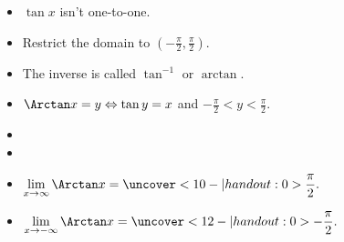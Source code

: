 \begin{frame}
\begin{columns}[c]
\begin{itemize}
\item<1->  $\tan x$ isn't one-to-one.
\item<2->  Restrict the domain to $(-\frac{\pi}2, \frac{\pi}2)$.
\item<3->  The inverse is called $\tan^{-1}$ or $\arctan$.
\item<4->  $\Arctan x = y \Leftrightarrow \tan y = x$ and $-\frac{\pi}2 < y < \frac{\pi}2$.
\item<5->  
\item<5->  
\item<9->  \alert<handout:0| 9-10>{$\displaystyle \lim_{x\rightarrow \infty} \Arctan x = \uncover<10-| handout:0>{\frac{\pi}2.}$}
\item<9->  \alert<handout:0| 11-12>{$\displaystyle \lim_{x\rightarrow - \infty} \Arctan x = \uncover<12-| handout:0>{- \frac{\pi}2.}$}
\end{itemize}
\end{columns}
\end{frame}
